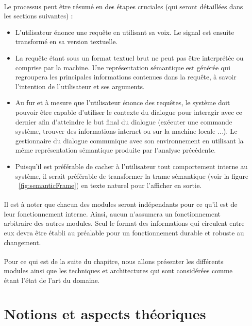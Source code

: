 \paragraph{}
Le processus peut être résumé en des étapes cruciales (qui seront détaillées dans les sections suivantes) : 
\begin{itemize}
	\label{spaLifeCycle}
	\item L'utilisateur énonce une requête en utilisant sa voix. Le signal est ensuite transformé en sa version textuelle.
	\item La requête étant sous un format textuel brut ne peut pas être interprétée ou comprise par la machine. Une représentation sémantique est générée qui regroupera les principales informations contenues dans la requête, à savoir l'intention de l'utilisateur et ses arguments.
	\item Au fur et à mesure que l'utilisateur énonce des requêtes, le système doit pouvoir être capable d'utiliser le contexte du dialogue pour interagir avec ce dernier afin d'atteindre le but final du dialogue (exécuter une commande système, trouver des informations internet ou sur la machine locale ...). Le gestionnaire du dialogue communique avec son environnement en utilisant la même représentation sémantique produite par l'analyse précédente.
	\item Puisqu'il est préférable de cacher à l'utilisateur tout comportement interne au système, il serait préférable de transformer la trame sémantique (voir la figure ~\ref{fig:semanticFrame}) en texte naturel pour l'afficher en sortie.
\end{itemize}
\paragraph{}
Il est à noter que chacun des modules seront indépendants pour ce qu'il est de leur fonctionnement interne. Ainsi, aucun n'assumera un fonctionnement arbitraire des autres modules. Seul le format des informations qui circulent entre eux devra être établi au préalable pour un fonctionnement durable et robuste au changement.
\paragraph{}
Pour ce qui est de la suite du chapitre, nous allons présenter les différents modules ainsi que les techniques et architectures qui sont considérées comme étant l'état de l'art du domaine. 

\section{Notions et aspects théoriques}
